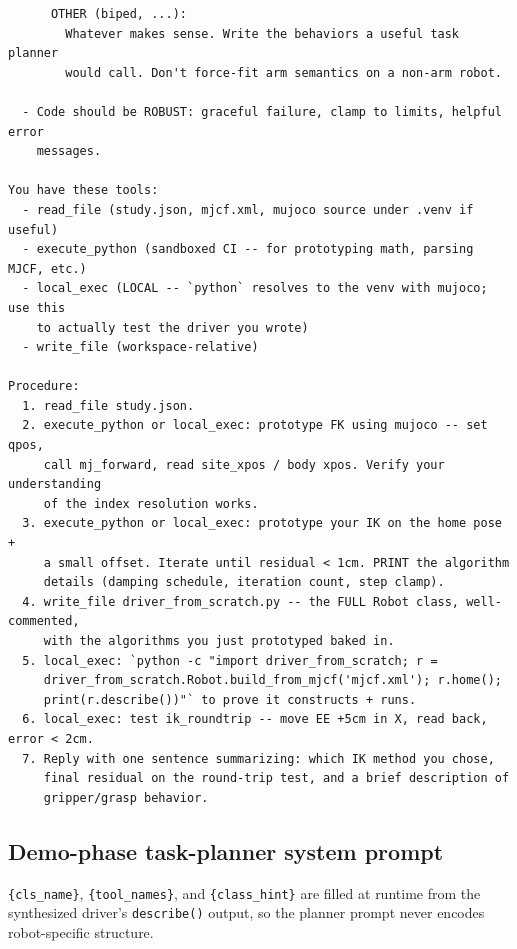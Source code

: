 {\begin{verbatim}
      OTHER (biped, ...):
        Whatever makes sense. Write the behaviors a useful task planner
        would call. Don't force-fit arm semantics on a non-arm robot.

  - Code should be ROBUST: graceful failure, clamp to limits, helpful error
    messages.

You have these tools:
  - read_file (study.json, mjcf.xml, mujoco source under .venv if useful)
  - execute_python (sandboxed CI -- for prototyping math, parsing MJCF, etc.)
  - local_exec (LOCAL -- `python` resolves to the venv with mujoco; use this
    to actually test the driver you wrote)
  - write_file (workspace-relative)

Procedure:
  1. read_file study.json.
  2. execute_python or local_exec: prototype FK using mujoco -- set qpos,
     call mj_forward, read site_xpos / body xpos. Verify your understanding
     of the index resolution works.
  3. execute_python or local_exec: prototype your IK on the home pose +
     a small offset. Iterate until residual < 1cm. PRINT the algorithm
     details (damping schedule, iteration count, step clamp).
  4. write_file driver_from_scratch.py -- the FULL Robot class, well-commented,
     with the algorithms you just prototyped baked in.
  5. local_exec: `python -c "import driver_from_scratch; r =
     driver_from_scratch.Robot.build_from_mjcf('mjcf.xml'); r.home();
     print(r.describe())"` to prove it constructs + runs.
  6. local_exec: test ik_roundtrip -- move EE +5cm in X, read back, error < 2cm.
  7. Reply with one sentence summarizing: which IK method you chose,
     final residual on the round-trip test, and a brief description of
     gripper/grasp behavior.
\end{verbatim}}

\subsection{Demo-phase task-planner system prompt}

\texttt{\{cls\_name\}}, \texttt{\{tool\_names\}}, and \texttt{\{class\_hint\}} are filled at runtime from the synthesized driver's \texttt{describe()} output, so the planner prompt never encodes robot-specific structure.

